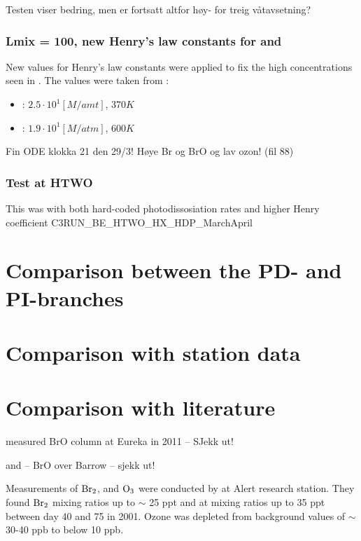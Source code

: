 Testen viser bedring, men  er fortsatt altfor høy- for treig våtavsetning? 

\subsubsection{Lmix = 100, new Henry's law constants for  and }\label{sec:new_henrys_law}

New values for Henry's law constants were applied to fix the high concentrations seen in . The values were taken from \cite{dean1999}:

\begin{itemize}
    \item {}: $2.5 \cdot 10^{1} [M/amt]$, $370 K$
    \item {}: $1.9\cdot10^1 [M/atm]$, $600 K$ 
\end{itemize}

Fin ODE klokka 21 den 29/3! Høye Br og BrO og lav ozon! (fil 88) 


\subsubsection{Test at HTWO}

This was with both hard-coded photodissosiation rates and higher Henry coefficient C3RUN\_BE\_HTWO\_HX\_HDP\_MarchApril

\section{Comparison between the PD- and PI-branches}

\section{Comparison with station data}

\section{Comparison with literature}

\cite{Zhao2016} measured BrO column at Eureka in 2011 -- SJekk ut! 


\cite{Peterson2016} and \cite{Peterson2015} -- BrO over Barrow -- sjekk ut! 

Measurements of $\mathrm{Br_2}$,  and $\mathrm{O_3}$ were conducted by \cite{Foster2001} at Alert research station. They found $\mathrm{Br_2}$ mixing ratios up to $\sim$ 25 \acrshort{ppt} and  at mixing ratios up to 35 \acrshort{ppt} between day 40 and 75 in 2001. Ozone was depleted from background values of $\sim$ 30-40 \acrshort{ppb} to below 10 ppb. 

